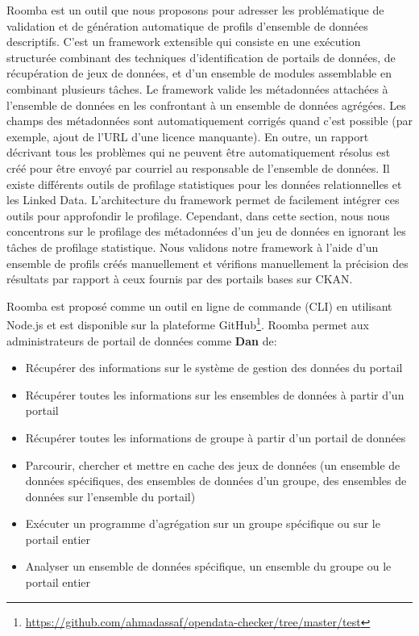Roomba est un outil que nous proposons pour adresser les probl\'{e}matique de validation et de g\'{e}n\'{e}ration automatique de profils d'ensemble de donn\'{e}es descriptifs. C'est un framework extensible qui consiste en une ex\'{e}cution structur\'{e}e combinant des techniques d'identification de portails de donn\'{e}es, de r\'{e}cup\'{e}ration de jeux de donn\'{e}es, et d'un ensemble de modules assemblable en combinant plusieurs tâches. Le framework valide les m\'{e}tadonn\'{e}es attach\'{e}es \`{a} l'ensemble de donn\'{e}es en les confrontant \`{a} un ensemble de donn\'{e}es agr\'{e}g\'{e}es. Les champs des m\'{e}tadonn\'{e}es sont automatiquement corrig\'{e}s quand c'est possible (par exemple, ajout de l'URL d'une licence manquante). En outre, un rapport d\'{e}crivant tous les probl\`{e}mes qui ne peuvent \^{e}tre automatiquement r\'{e}solus est cr\'{e}\'{e} pour \^{e}tre envoy\'{e} par courriel au responsable de l'ensemble de donn\'{e}es. Il existe diff\'{e}rents outils de profilage statistiques pour les donn\'{e}es relationnelles et les Linked Data. L'architecture du framework permet de facilement int\'{e}grer ces outils pour approfondir le profilage. Cependant, dans cette section, nous nous concentrons sur le profilage des m\'{e}tadonn\'{e}es d'un jeu de donn\'{e}es en ignorant les tâches de profilage statistique. Nous validons notre framework \`{a} l'aide d'un ensemble de profils cr\'{e}\'{e}s manuellement et v\'{e}rifions manuellement la pr\'{e}cision des r\'{e}sultats par rapport \`{a} ceux fournis par des portails bases sur CKAN.

Roomba est propos\'{e} comme un outil en ligne de commande (CLI) en utilisant Node.js et est disponible sur la plateforme GitHub\footnote{\url{https://github.com/ahmadassaf/opendata-checker/tree/master/test}}. Roomba permet aux administrateurs de portail de donn\'{e}es comme \textbf{Dan} de:

\begin{itemize}
	\item R\'{e}cup\'{e}rer des informations sur le syst\`{e}me de gestion des donn\'{e}es du portail
	\item R\'{e}cup\'{e}rer toutes les informations sur les ensembles de donn\'{e}es \`{a} partir d'un portail
	\item R\'{e}cup\'{e}rer toutes les informations de groupe \`{a} partir d'un portail de donn\'{e}es
	\item Parcourir, chercher et mettre en cache des jeux de donn\'{e}es (un ensemble de donn\'{e}es sp\'{e}cifiques, des ensembles de donn\'{e}es d'un groupe, des ensembles de donn\'{e}es sur l'ensemble du portail)
	\item Ex\'{e}cuter un programme d'agr\'{e}gation sur un groupe sp\'{e}cifique ou sur le portail entier
	\item Analyser un ensemble de donn\'{e}es sp\'{e}cifique, un ensemble du groupe ou le portail entier
\end{itemize}

